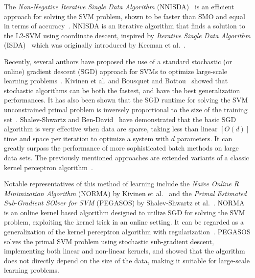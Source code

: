 \documentclass[reqno]{vcuthesis}
\numberwithin{equation}{chapter}
\begin{document}
The \textit{Non-Negative Iterative Single Data Algorithm} (NNISDA)~\cite{zigic2016} is an efficient approach for solving the SVM problem, shown to be faster than SMO and equal in terms of accuracy~\cite{Kecman2014}. NNISDA is an iterative algorithm that finds a solution to the L2-SVM using coordinate descent, inspired by \textit{Iterative Single Data Algorithm} (ISDA)~\cite{Huang2006} which was originally introduced by Kecman et al.~\cite{Kecman2005}.

Recently, several authors have proposed the use of a standard stochastic (or online) gradient descent (SGD) approach for SVMs to optimize large-scale learning problems~\cite{herbrich2016learning,kivinen2002large,Schoelkopf2002,Shalev2014,shalev2011pegasos}. Kivinen et al.\cite{kivinen2004online} and Bousquet and Bottou~\cite{bousquet2008tradeoffs} showed that stochastic algorithms can be both the fastest, and have the best generalization performances. It has also been shown that the SGD runtime for solving the SVM unconstrained primal problem is inversely proportional to the size of the training set~\cite{panagiotakopoulos2013stochastic,shalev2008svm}. Shalev-Shwartz and Ben-David~\cite{Shalev2014} have demonstrated that the basic SGD algorithm is very effective when data are sparse, taking less than linear $[O(d)]$ time and space per iteration to optimize a system with $d$ parameters. It can greatly surpass the performance of more sophisticated batch methods on large data sets. The previously mentioned approaches are extended variants of a classic kernel perceptron algorithm~\cite{collobert2004links}. 

Notable representatives of this method of learning include the \textit{Na{\"i}ve Online R Minimization Algorithm} (NORMA) by Kivinen et al.~\cite{kivinen2004online} and the \textit{Primal Estimated Sub-Gradient SOlver for SVM} (PEGASOS) by Shalev-Shwartz et al.~\cite{shalev2011pegasos}. NORMA is an online kernel based algorithm designed to utilize SGD for solving the SVM problem, exploiting the kernel trick in an online setting. It can be regarded as a generalization of the kernel perceptron algorithm with regularization~\cite{kivinen2004online}. PEGASOS solves the primal SVM problem using stochastic sub-gradient descent, implementing both linear and non-linear kernels, and showed that the algorithm does not directly depend on the size of the data, making it suitable for large-scale learning problems. 
\end{document}
